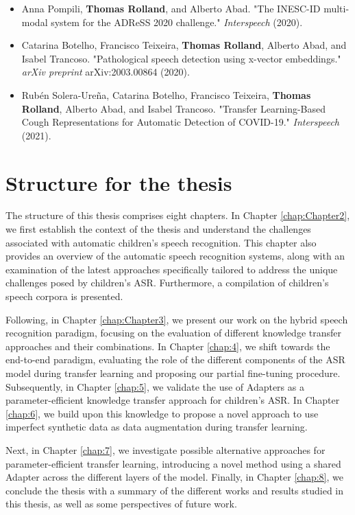 \begin{itemize}
    \item Anna Pompili, \textbf{Thomas Rolland}, and Alberto Abad. "The INESC-ID multi-modal system for the ADReSS 2020 challenge." \textit{Interspeech} (2020).
    \item Catarina Botelho, Francisco Teixeira, \textbf{Thomas Rolland}, Alberto Abad, and Isabel Trancoso. "Pathological speech detection using x-vector embeddings." \textit{arXiv preprint} arXiv:2003.00864 (2020).
    \item Rubén Solera-Ureña, Catarina Botelho, Francisco Teixeira, \textbf{Thomas Rolland}, Alberto Abad, and Isabel Trancoso. "Transfer Learning-Based Cough Representations for Automatic Detection of COVID-19." \textit{Interspeech} (2021).
\end{itemize}


\section{Structure for the thesis}
The structure of this thesis comprises eight chapters. In Chapter \ref{chap:Chapter2}, we first establish the context of the thesis and understand the challenges associated with automatic children's speech recognition. This chapter also provides an overview of the automatic speech recognition systems, along with an examination of the latest approaches specifically tailored to address the unique challenges posed by children's \ac{ASR}. Furthermore, a compilation of children's speech corpora is presented.

Following, in Chapter \ref{chap:Chapter3}, we present our work on the hybrid speech recognition paradigm, focusing on the evaluation of different knowledge transfer approaches and their combinations. In Chapter \ref{chap:4}, we shift towards the end-to-end paradigm, evaluating the role of the different components of the \ac{ASR} model during transfer learning and proposing our partial fine-tuning procedure. Subsequently, in Chapter \ref{chap:5}, we validate the use of Adapters as a parameter-efficient knowledge transfer approach for children's \ac{ASR}. In Chapter \ref{chap:6}, we build upon this knowledge to propose a novel approach to use imperfect synthetic data as data augmentation during transfer learning.

Next, in Chapter \ref{chap:7}, we investigate possible alternative approaches for parameter-efficient transfer learning, introducing a novel method using a shared Adapter across the different layers of the model. Finally, in Chapter \ref{chap:8}, we conclude the thesis with a summary of the different works and results studied in this thesis, as well as some perspectives of future work. 